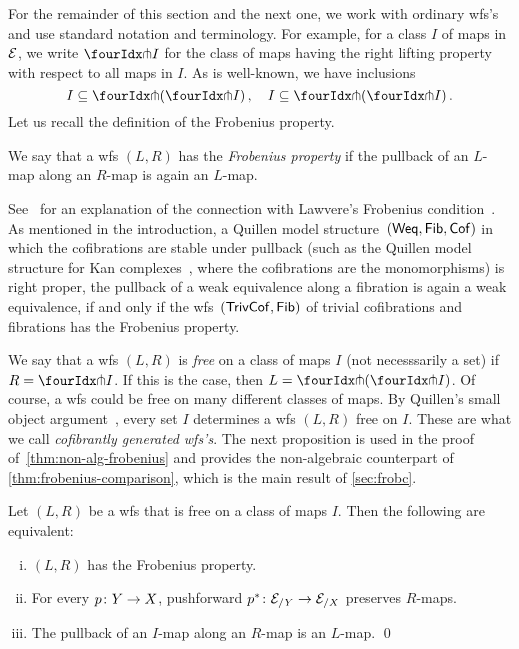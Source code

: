 \documentclass[reqno,10pt,a4paper,oneside,draft]{amsart}
\begin{document}
For the remainder of this section and the next one, we work with ordinary wfs's~\cite{bousfield-wfs} and use standard notation and terminology.
For example, for a class $I$ of maps in $\cal{E}$, we write $\liftr{I}$ for the class of maps having the right lifting property with respect to all maps in $I$.
As is well-known, we have inclusions
\begin{equation} \label{equ:inclus-orthog}
I \subseteq \liftl{(\liftr{I})}
\, , \quad
I \subseteq \liftr{(\liftl{I})}
\, .\end{equation}
Let us recall the definition of the Frobenius property.

\begin{definition}
We say that a wfs $(L, R)$ has the \emph{Frobenius property} if the pullback of an $L$-map along an $R$-map is again an $L$-map.
\end{definition}

See~\cite{clementino:frobenius} for an explanation of the connection with Lawvere's Frobenius condition~\cite{lawvere-equality}.
As mentioned in the introduction, a Quillen model structure~$(\mathsf{Weq}, \Fib, \Cof)$ in which the cofibrations are stable under pullback (such as the Quillen model structure for Kan complexes~\cite{quillen-homotopical}, where the cofibrations are the monomorphisms) is right proper, \ie the pullback of a weak equivalence along a fibration is again a weak equivalence, if and only if the wfs~$(\TrivCof, \Fib)$ of trivial cofibrations and fibrations has the Frobenius property.

We say that a wfs $(L, R)$ is \emph{free} on a class of maps $I$ (not necesssarily a set) if $R = \liftr{I}$.
If this is the case, then $L = \liftl{(\liftr{I})}$.
Of course, a wfs could be free on many different classes of maps.
By Quillen's small object argument~\cite{quillen-homotopical}, every set $I$ determines a wfs $(L, R)$ free on $I$.
These are what we call \emph{cofibrantly generated wfs's}.
The next proposition is used in the proof of~\cref{thm:non-alg-frobenius} and provides the non-algebraic counterpart of \cref{thm:frobenius-comparison}, which is the main result of \cref{sec:frobc}.

\begin{proposition} \label{thm:frobenius-equivalence}
Let $(L, R)$ be a wfs that is free on a class of maps $I$.
Then the following are equivalent:
\begin{enumerate}[(i)]
\item $(L,R)$ has the Frobenius property.
\item For every $p \co Y \to X$, pushforward $p^* \co \cal{E}_{/Y} \to \cal{E}_{/X}$ preserves $R$-maps.
\item The pullback of an $I$-map along an $R$-map is an $L$-map.
\qed
\end{enumerate}
\end{proposition}
\end{document}
